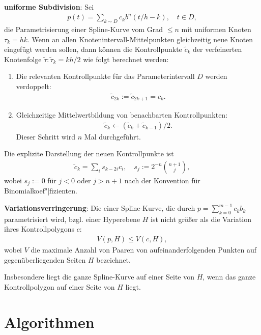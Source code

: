 \linie

\textbf{uniforme Subdivision}:
Sei
\begin{align*}
    p(t) = \sum_{k \sim D} c_k b^n(t/h - k),\quad t \in D,
\end{align*}
die Parametrisierung einer Spline-Kurve vom Grad $\le n$ mit uniformen Knoten $\tau_k = hk$.
Wenn an allen Knotenintervall-Mittelpunkten gleichzeitig neue Knoten eingefügt werden sollen,
dann können die Kontrollpunkte $\widetilde{c}_k$ der verfeinerten Knotenfolge
$\widetilde{\tau}\colon \widetilde{\tau}_k = kh/2$ wie folgt berechnet werden:
\begin{enumerate}
    \item
    Die relevanten Kontrollpunkte für das Parameterintervall $D$ werden verdoppelt:
    \begin{align*}
        \widetilde{c}_{2k} := \widetilde{c}_{2k+1} = c_k.
    \end{align*}

    \item
    Gleichzeitige Mittelwertbildung von benachbarten Kontrollpunkten:
    \begin{align*}
        \widetilde{c}_k \leftarrow (\widetilde{c}_k + \widetilde{c}_{k-1})/2.
    \end{align*}
    Dieser Schritt wird $n$ Mal durchgeführt.
\end{enumerate}
Die explizite Darstellung der neuen Kontrollpunkte ist
\begin{align*}
    \widetilde{c}_k = \sum_i s_{k-2i} c_i,\quad
    s_j := 2^{-n} \binom{n + 1}{j},
\end{align*}
wobei $s_j := 0$ für $j < 0$ oder $j > n + 1$ nach der Konvention für Binomialkoef"|fizienten.

\linie
\pagebreak

\textbf{Variationsverringerung}:
Die  einer Spline-Kurve, die durch $p = \sum_{k=0}^{m-1} c_k b_k$
parametrisiert wird, bzgl. einer Hyperebene $H$ ist nicht größer als die Variation
ihres Kontrollpolygons $c$:
\begin{align*}
    V(p, H) \le V(c, H),
\end{align*}
wobei $V$ die maximale Anzahl von Paaren von aufeinanderfolgenden Punkten auf gegenüberliegenden
Seiten $H$ bezeichnet.

Insbesondere liegt die ganze Spline-Kurve auf einer Seite von $H$, wenn das
ganze Kontrollpolygon auf einer Seite von $H$ liegt.

\section{%
    Algorithmen%
}

